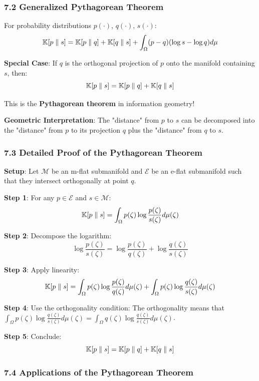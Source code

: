 \documentclass{amsart}
\let\originalmathbb\mathbb
\renewcommand{\mathbb}[1]{%
    \ifstrequal{#1}{1}{\mathbbm{#1}}{\originalmathbb{#1}}%
}
\theoremstyle{plain}
\theoremstyle{definition}
\theoremstyle{remark}
\begin{document}
\subsubsection{7.2 Generalized Pythagorean Theorem}

For probability distributions $p(\cdot)$, $q(\cdot)$, $s(\cdot)$:
\[
\mathbb{K}[p \parallel s] = \mathbb{K}[p \parallel q] + \mathbb{K}[q \parallel s] + \int_{\Omega} (p - q)(\log s - \log q) d\mu
\]

\textbf{Special Case}: If $q$ is the orthogonal projection of $p$ onto the manifold containing $s$, then:
\[
\mathbb{K}[p \parallel s] = \mathbb{K}[p \parallel q] + \mathbb{K}[q \parallel s]
\]

This is the \textbf{Pythagorean theorem} in information geometry!

\textbf{Geometric Interpretation}: The "distance" from $p$ to $s$ can be decomposed into the "distance" from $p$ to its projection $q$ plus the "distance" from $q$ to $s$.

\subsubsection{7.3 Detailed Proof of the Pythagorean Theorem}

\textbf{Setup}: Let $\mathcal{M}$ be an m-flat submanifold and $\mathcal{E}$ be an e-flat submanifold such that they intersect orthogonally at point $q$.

\textbf{Step 1}: For any $p \in \mathcal{E}$ and $s \in \mathcal{M}$:
\[
\mathbb{K}[p \parallel s] = \int_{\Omega} p(\zeta) \log \frac{p(\zeta)}{s(\zeta)} d\mu(\zeta)
\]

\textbf{Step 2}: Decompose the logarithm:
\[
\log \frac{p(\zeta)}{s(\zeta)} = \log \frac{p(\zeta)}{q(\zeta)} + \log \frac{q(\zeta)}{s(\zeta)}
\]

\textbf{Step 3}: Apply linearity:
\[
\mathbb{K}[p \parallel s] = \int_{\Omega} p(\zeta) \log \frac{p(\zeta)}{q(\zeta)} d\mu(\zeta) + \int_{\Omega} p(\zeta) \log \frac{q(\zeta)}{s(\zeta)} d\mu(\zeta)
\]

\textbf{Step 4}: Use the orthogonality condition:
The orthogonality means that $\int_{\Omega} p(\zeta) \log \frac{q(\zeta)}{s(\zeta)} d\mu(\zeta) = \int_{\Omega} q(\zeta) \log \frac{q(\zeta)}{s(\zeta)} d\mu(\zeta)$.

\textbf{Step 5}: Conclude:
\[
\mathbb{K}[p \parallel s] = \mathbb{K}[p \parallel q] + \mathbb{K}[q \parallel s]
\]

\subsubsection{7.4 Applications of the Pythagorean Theorem}
\end{document}
